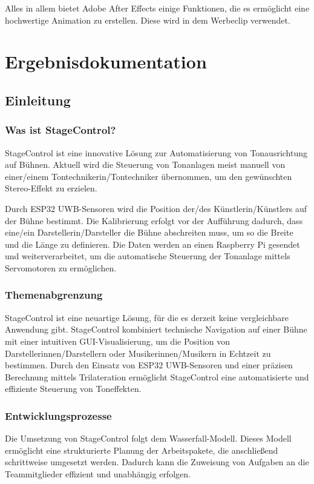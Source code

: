 Alles in allem bietet Adobe After Effects einige Funktionen, die es ermöglicht eine hochwertige Animation zu erstellen. Diese wird in dem Werbeclip verwendet. 
\chapter{Ergebnisdokumentation}
\section{Einleitung}
\subsection{Was ist StageControl?}
StageControl ist eine innovative Lösung zur Automatisierung von Tonausrichtung auf Bühnen. Aktuell wird die Steuerung von Tonanlagen meist manuell von einer/einem Tontechnikerin/Tontechniker übernommen, um den gewünschten Stereo-Effekt zu erzielen.

Durch ESP32 UWB-Sensoren wird die Position der/des Künstlerin/Künstlers auf der Bühne bestimmt. Die Kalibrierung erfolgt vor der Aufführung dadurch, dass eine/ein Darstellerin/Darsteller die Bühne abschreiten muss, um so die Breite und die Länge zu definieren. Die Daten werden an einen Raspberry Pi gesendet und weiterverarbeitet, um die automatische Steuerung der Tonanlage mittels Servomotoren zu ermöglichen.

\subsection{Themenabgrenzung}
StageControl ist eine neuartige Lösung, für die es derzeit keine vergleichbare Anwendung gibt. StageControl kombiniert technische Navigation auf einer Bühne mit einer intuitiven GUI-Visualisierung, um die Position von Darstellerinnen/Darstellern oder Musikerinnen/Musikern in Echtzeit zu bestimmen. Durch den Einsatz von ESP32 UWB-Sensoren und einer präzisen Berechnung mittels Trilateration ermöglicht StageControl eine automatisierte und effiziente Steuerung von Toneffekten.

\subsection{Entwicklungsprozesse}  
Die Umsetzung von StageControl folgt dem Wasserfall-Modell. Dieses Modell ermöglicht eine strukturierte Planung der Arbeitspakete, die anschließend schrittweise umgesetzt werden. Dadurch kann die Zuweisung von Aufgaben an die Teammitglieder effizient und unabhängig erfolgen.  

